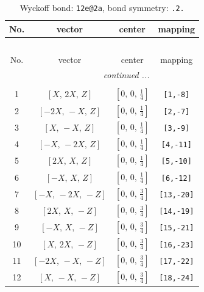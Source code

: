 \documentclass[fleqn,8pt]{jsarticle}
\begin{document}
\renewcommand{\arraystretch}{1.2}
\begin{longtable}{cccc}
\caption{Wyckoff bond: {\tt 12e@2a}, bond symmetry: {\tt .2.}}
 \\
 \hline \hline
No. & vector & center & mapping \\ \hline \endfirsthead

\multicolumn{3}{l}{\tablename\ \thetable{}} \\
 \hline \hline
No. & vector & center & mapping \\ \hline \endhead

 \hline \hline
\multicolumn{3}{r}{\footnotesize\it continued ...} \\ \endfoot

 \hline \hline
\multicolumn{3}{r}{} \\ \endlastfoot

1 & $\left[ X,\, 2 X,\, Z \right]$ & $\left[ 0,\, 0,\, \frac{1}{4} \right]$ & {\tt [1,-8]} \\ \hline
2 & $\left[ - 2 X,\, - X,\, Z \right]$ & $\left[ 0,\, 0,\, \frac{1}{4} \right]$ & {\tt [2,-7]} \\ \hline
3 & $\left[ X,\, - X,\, Z \right]$ & $\left[ 0,\, 0,\, \frac{1}{4} \right]$ & {\tt [3,-9]} \\ \hline
4 & $\left[ - X,\, - 2 X,\, Z \right]$ & $\left[ 0,\, 0,\, \frac{1}{4} \right]$ & {\tt [4,-11]} \\ \hline
5 & $\left[ 2 X,\, X,\, Z \right]$ & $\left[ 0,\, 0,\, \frac{1}{4} \right]$ & {\tt [5,-10]} \\ \hline
6 & $\left[ - X,\, X,\, Z \right]$ & $\left[ 0,\, 0,\, \frac{1}{4} \right]$ & {\tt [6,-12]} \\ \hline
7 & $\left[ - X,\, - 2 X,\, - Z \right]$ & $\left[ 0,\, 0,\, \frac{3}{4} \right]$ & {\tt [13,-20]} \\ \hline
8 & $\left[ 2 X,\, X,\, - Z \right]$ & $\left[ 0,\, 0,\, \frac{3}{4} \right]$ & {\tt [14,-19]} \\ \hline
9 & $\left[ - X,\, X,\, - Z \right]$ & $\left[ 0,\, 0,\, \frac{3}{4} \right]$ & {\tt [15,-21]} \\ \hline
10 & $\left[ X,\, 2 X,\, - Z \right]$ & $\left[ 0,\, 0,\, \frac{3}{4} \right]$ & {\tt [16,-23]} \\ \hline
11 & $\left[ - 2 X,\, - X,\, - Z \right]$ & $\left[ 0,\, 0,\, \frac{3}{4} \right]$ & {\tt [17,-22]} \\ \hline
12 & $\left[ X,\, - X,\, - Z \right]$ & $\left[ 0,\, 0,\, \frac{3}{4} \right]$ & {\tt [18,-24]} \\
\end{longtable}
\end{document}
